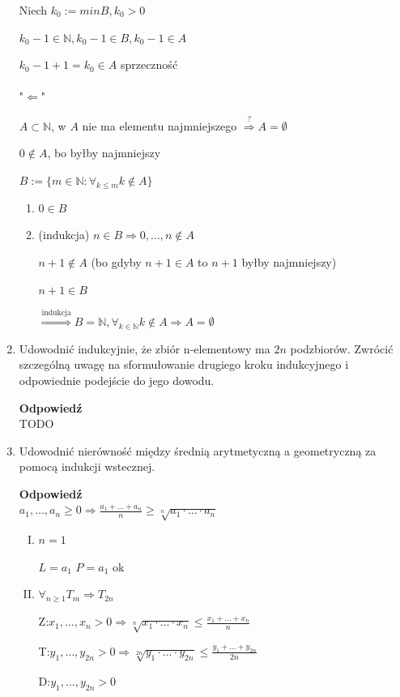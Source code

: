 \documentclass[12pt,a4paper]{article}
\theoremstyle{break}
\newcommand{\Odp}[1]{
		\begin{mdframed}[style=zadanie]
			\textbf{Odpowiedź}\\
			#1
		\end{mdframed}
	}
\begin{document}
\begin{enumerate}[1.]
{		Niech $k_0:= min B, k_0 >0$
		
		$k_0-1 \in \mathbb{N}, k_0-1\in B, k_0-1\in A$
		
		$k_0-1+1 = k_0 \in A$ sprzeczność\\\\
		
		"$\Leftarrow$"
		
		$A\subset \mathbb{N}$, w $A$ nie ma elementu najmniejszego $\overset{?}{\Rightarrow} A=\emptyset$
		
		$0\notin A$, bo byłby najmniejszy
		
		$B:= \{ m\in \mathbb{N}:\forall_{k\leq m} k\notin A\}$
		
		\begin{enumerate}[I]
			\item $0\in B$
			\item (indukcja) $n\in B \Rightarrow 0,\dots,n\notin A$
			
			$n+1\notin A$ (bo gdyby $n+1\in A$ to $n+1$ byłby najmniejszy)
			
			$n+1\in B$
			
			$\overset{\text{indukcja}}{\Rightarrow} B=\mathbb{N}, \forall_{k\in \mathbb{N}} k\notin A \Rightarrow A=\emptyset$
		\end{enumerate}
	}
	
	\item Udowodnić indukcyjnie, że zbiór n-elementowy ma $2n$ podzbiorów. Zwrócić szczególną uwagę na sformułowanie drugiego kroku indukcyjnego i odpowiednie podejście do jego dowodu.
	\Odp{
		TODO
	}
	
	\item Udowodnić nierówność między średnią arytmetyczną a geometryczną za pomocą indukcji wstecznej.
	\Odp{
		$a_1,\dots,a_n\geq 0 \Rightarrow \frac{a_1+\dots+a_n}{n}\geq \sqrt[n]{a_1\cdot \dots \cdot a_n}$
		
		\begin{enumerate}[I)]
			\item $n=1$
			
			$L=a_1$ $P=a_1$ ok
			
			\item $\forall_{n\geq 1} T_m\Rightarrow T_{2n}$
			
			Z:$x_1,\dots,x_n >0 \Rightarrow \sqrt[n]{x_1\cdot \dots \cdot x_n}\leq \frac{x_1+\dots+x_n}{n}$
			
			T:$y_1,\dots,y_{2n} >0 \Rightarrow \sqrt[2n]{y_1\cdot \dots \cdot y_{2n}}\leq \frac{y_1+\dots+y_{2n}}{2n}$
			
			D:$y_1,\dots,y_{2n}>0$
			

\end{enumerate}}
\end{enumerate}
\end{document}
